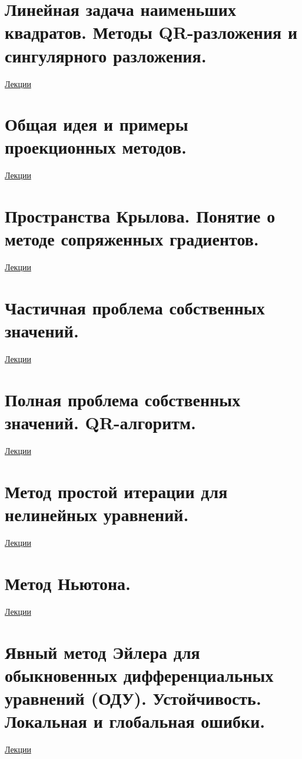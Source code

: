 \documentclass[specialist, subf, href, colorlinks=true, 12pt, times, mtpro, final]{disser}
\theoremstyle{definition}
\begin{document}
\section {Линейная задача наименьших квадратов. Методы QR-разложения и сингулярного разложения.}
	\hyperlink {lects.72}{Лекции}\\

\section {Общая идея и примеры проекционных методов.}
	\hyperlink {lects.74}{Лекции}\\

\section {Пространства Крылова. Понятие о методе сопряженных градиентов.}
	\hyperlink {lects.74}{Лекции}\\

\section {Частичная проблема собственных значений.}
	\hyperlink {lects.78}{Лекции}\\

\section {Полная проблема собственных значений. QR-алгоритм.}
	\hyperlink {lects.79}{Лекции}\\

\section {Метод простой итерации для нелинейных уравнений.}
	\hyperlink {lects.82}{Лекции}\\

\section {Метод Ньютона.}
	\hyperlink {lects.83}{Лекции}\\

\section {Явный метод Эйлера для обыкновенных дифференциальных уравнений (ОДУ). Устойчивость. Локальная и глобальная ошибки.}
	\hyperlink {lects.87}{Лекции}\\
\end{document}
